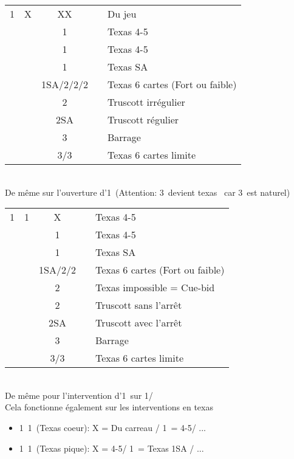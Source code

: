 \documentclass[a4paper, oneside, 11pt]{report}
\begin{document}
\newpage
		\begin{tabular}{cccc|l}
		1\trefle & X & XX && Du jeu\\
		&& 1\carreau && Texas 4-5\coeur\\
		&& 1\coeur && Texas 4-5\pique\\
		&& 1\pique && Texas SA\\
		&& 1SA/2\trefle/2\carreau/2\coeur && Texas 6 cartes (Fort ou faible)\\
		&& 2\pique && Truscott irrégulier\\
		&& 2SA && Truscott régulier\\
		&& 3\trefle && Barrage\\
		&& 3\carreau/3\coeur && Texas 6 cartes limite\\
		\end{tabular}\\
		De même sur l'ouverture d'1\carreau\ (Attention: 3\trefle\ devient texas \coeur\ car 3\carreau\ est naturel)\\

		\begin{tabular}{cccc|l}
		1\trefle & 1\carreau & X && Texas 4-5\coeur\\
		&& 1\coeur && Texas 4-5\pique\\
		&& 1\pique && Texas SA\\
		&& 1SA/2\carreau/2\coeur && Texas 6 cartes (Fort ou faible)\\
		&& 2\trefle && Texas impossible = Cue-bid\\
		&& 2\pique && Truscott sans l'arrêt \carreau\\
		&& 2SA && Truscott avec l'arrêt \carreau\\
		&& 3\trefle && Barrage\\
		&& 3\carreau/3\coeur && Texas 6 cartes limite\\
		\end{tabular}\\
		De même pour l'intervention d'1\coeur\ sur 1\trefle/\carreau\\

		Cela fonctionne également sur les interventions en texas
		\begin{itemize}
		\item 1\trefle\ 1\carreau\ (Texas coeur): X = Du carreau / 1\coeur\ = 4-5\pique / ...
		\item 1\trefle\ 1\coeur\ (Texas pique): X = 4-5\coeur / 1\pique\ = Texas 1SA / ...\\
		\end{itemize}
\end{document}
